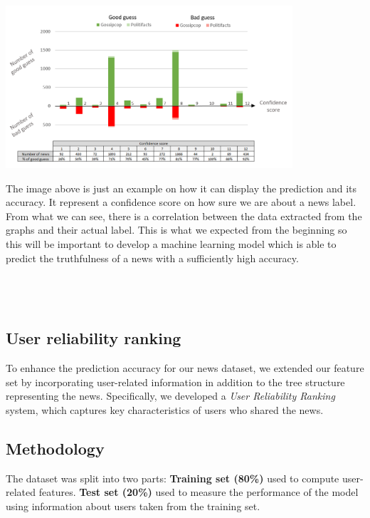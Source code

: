 \documentclass[11pt,a4paper]{article}
\begin{document}
\begin{center}
	\includegraphics[width=0.8\textwidth]{graph}
\end{center}

The image above is just an example on how it can display the prediction and its accuracy. It represent
a conﬁdence score on how sure we are about a news label. From what we can see, there is a correlation between the data extracted from
the graphs and their actual label. This is what we expected from the beginning so this will be important to develop a machine learning model which is able to predict the truthfulness of a news with a sufficiently high accuracy.

\subsection*{\\ \\User reliability ranking}
To enhance the prediction accuracy for our news dataset, we extended our feature set by incorporating user-related information in addition to the tree structure representing the news. Specifically, we developed a \textit{User Reliability Ranking} system, which captures key characteristics of users who shared the news.

\subsection*{Methodology}

The dataset was split into two parts: \textbf{Training set (80\%)} used to compute user-related features. \textbf{Test set (20\%)} used to measure the performance of the model using information about users taken from the training set.
\end{document}
